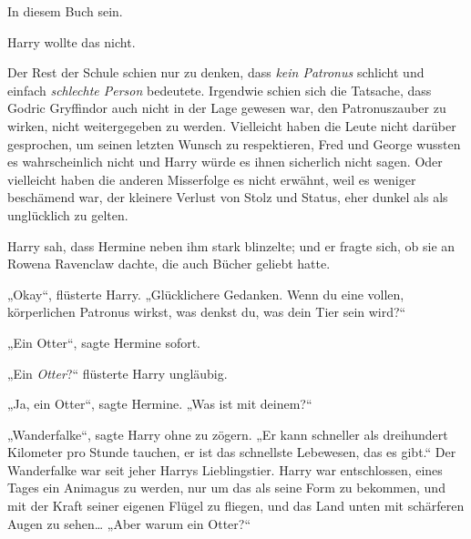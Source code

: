 In diesem Buch sein.

Harry wollte das nicht.

Der Rest der Schule schien nur zu denken, dass \emph{kein Patronus} schlicht und einfach \emph{schlechte Person} bedeutete. Irgendwie schien sich die Tatsache, dass Godric Gryffindor auch nicht in der Lage gewesen war, den Patronuszauber zu wirken, nicht weitergegeben zu werden. Vielleicht haben die Leute nicht darüber gesprochen, um seinen letzten Wunsch zu respektieren, Fred und George wussten es wahrscheinlich nicht und Harry würde es ihnen sicherlich nicht sagen. Oder vielleicht haben die anderen Misserfolge es nicht erwähnt, weil es weniger beschämend war, der kleinere Verlust von Stolz und Status, eher dunkel als als unglücklich zu gelten.

Harry sah, dass Hermine neben ihm stark blinzelte; und er fragte sich, ob sie an Rowena Ravenclaw dachte, die auch Bücher geliebt hatte.

„Okay“, flüsterte Harry. „Glücklichere Gedanken. Wenn du eine vollen, körperlichen Patronus wirkst, was denkst du, was dein Tier sein wird?“

„Ein Otter“, sagte Hermine sofort.

„Ein \emph{Otter}?“ flüsterte Harry ungläubig.

„Ja, ein Otter“, sagte Hermine. „Was ist mit deinem?“

„Wanderfalke“, sagte Harry ohne zu zögern. „Er kann schneller als dreihundert Kilometer pro Stunde tauchen, er ist das schnellste Lebewesen, das es gibt.“ Der Wanderfalke war seit jeher Harrys Lieblingstier. Harry war entschlossen, eines Tages ein Animagus zu werden, nur um das als seine Form zu bekommen, und mit der Kraft seiner eigenen Flügel zu fliegen, und das Land unten mit schärferen Augen zu sehen… „Aber warum ein Otter?“

